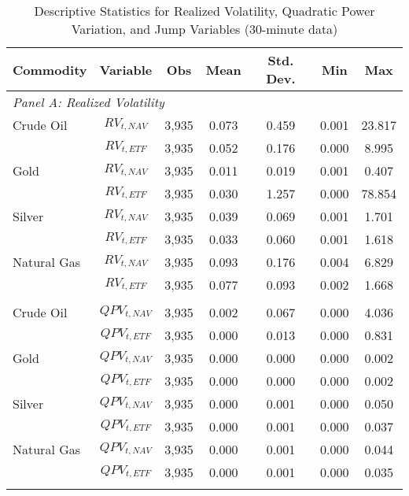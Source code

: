 \begin{table}[htbp]
\centering
\caption{Descriptive Statistics for Realized Volatility, Quadratic Power Variation, and Jump Variables (30-minute data)}
\label{tab:desc_stats_30min}
\begin{threeparttable}
\begin{tabular}{@{}lcccccc@{}}
\toprule
\multicolumn{1}{l}{Commodity} & Variable & Obs & Mean & Std. Dev. & Min & Max \\
\midrule
\multicolumn{7}{l}{\textit{Panel A: Realized Volatility}} \\
\addlinespace[0.1cm]
Crude Oil & $RV_{t,NAV}$ & 3,935 & 0.073 & 0.459 & 0.001 & 23.817 \\
          & $RV_{t,ETF}$ & 3,935 & 0.052 & 0.176 & 0.000 & 8.995 \\
\addlinespace[0.05cm]
Gold      & $RV_{t,NAV}$ & 3,935 & 0.011 & 0.019 & 0.001 & 0.407 \\
          & $RV_{t,ETF}$ & 3,935 & 0.030 & 1.257 & 0.000 & 78.854 \\
\addlinespace[0.05cm]
Silver    & $RV_{t,NAV}$ & 3,935 & 0.039 & 0.069 & 0.001 & 1.701 \\
          & $RV_{t,ETF}$ & 3,935 & 0.033 & 0.060 & 0.001 & 1.618 \\
\addlinespace[0.05cm]
Natural Gas & $RV_{t,NAV}$ & 3,935 & 0.093 & 0.176 & 0.004 & 6.829 \\
            & $RV_{t,ETF}$ & 3,935 & 0.077 & 0.093 & 0.002 & 1.668 \\
\addlinespace[0.2cm]

\multicolumn{7}{l}{\textit{Panel B: Quadratic Power Variation}} \\
\addlinespace[0.1cm]
Crude Oil & $QPV_{t,NAV}$ & 3,935 & 0.002 & 0.067 & 0.000 & 4.036 \\
          & $QPV_{t,ETF}$ & 3,935 & 0.000 & 0.013 & 0.000 & 0.831 \\
\addlinespace[0.05cm]
Gold      & $QPV_{t,NAV}$ & 3,935 & 0.000 & 0.000 & 0.000 & 0.002 \\
          & $QPV_{t,ETF}$ & 3,935 & 0.000 & 0.000 & 0.000 & 0.002 \\
\addlinespace[0.05cm]
Silver    & $QPV_{t,NAV}$ & 3,935 & 0.000 & 0.001 & 0.000 & 0.050 \\
          & $QPV_{t,ETF}$ & 3,935 & 0.000 & 0.001 & 0.000 & 0.037 \\
\addlinespace[0.05cm]
Natural Gas & $QPV_{t,NAV}$ & 3,935 & 0.000 & 0.001 & 0.000 & 0.044 \\
            & $QPV_{t,ETF}$ & 3,935 & 0.000 & 0.001 & 0.000 & 0.035 \\
\addlinespace[0.2cm]


\end{tabular}
\end{threeparttable}
\end{table}
